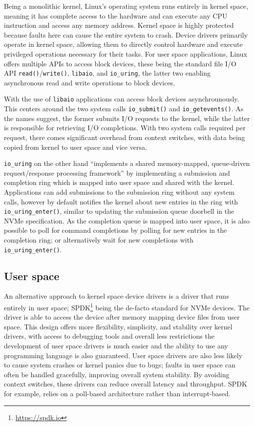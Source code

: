 Being a monolithic kernel, Linux's operating system runs entirely in kernel space, meaning it has complete access to the hardware and can execute any CPU instruction and access any memory address. Kernel space is highly protected because faults here can cause the entire system to crash. Device drivers primarily operate in kernel space, allowing them to directly control hardware and execute privileged operations necessary for their tasks. For user space applications, Linux offers multiple APIs to access block devices, these being the standard file I/O API \texttt{read()}/\texttt{write()}, \texttt{libaio}, and \texttt{io\_uring}, the latter two enabling asynchronous read and write operations to block devices.

With the use of \texttt{libaio} applications can access block devices asynchrounously. This centers around the two system calls \texttt{io\_submit()} and \texttt{io\_getevents()}. As the names suggest, the former submits I/O requests to the kernel, while the latter is responsible for retrieving I/O completions. With two system calls required per request, there comes significant overhead from context switches, with data being copied from kernel to user space and vice versa.

\texttt{io\_uring} on the other hand ``implements a shared memory-mapped, queue-driven request/response processing framework'' \cite{storage_api} by implementing a submission and completion ring which is mapped into user space and shared with the kernel. Applications can add submissions to the submission ring without any system calls, however by default notifies the kernel about new entries in the ring with \texttt{io\_uring\_enter()}, similar to updating the submission queue doorbell in the NVMe specification. As the completion queue is mapped into user space, it is also possible to poll for command completions by polling for new entries in the completion ring; or alternatively wait for new completions with \texttt{io\_uring\_enter()}.

\subsection{User space}
An alternative approach to kernel space device drivers is a driver that runs entirely in user space; SPDK\footnote{\url{https://spdk.io}} being the de-facto standard for NVMe devices. The driver is able to access the device after memory mapping device files from user space. This design offers more flexibility, simplicity, and stability over kernel drivers, with access to debugging tools and overall less restrictions the development of user space drivers is much easier and the ability to use any programming language is also guaranteed. User space drivers are also less likely to cause system crashes or kernel panics due to bugs; faults in user space can often be handled gracefully, improving overall system stability. By avoiding context switches, these drivers can reduce overall latency and throughput. SPDK for example, relies on a poll-based architecture rather than interrupt-based.

